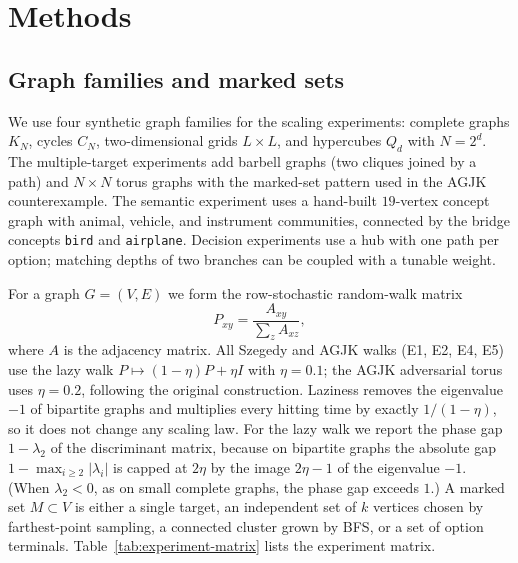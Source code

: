 \section{Methods}
\label{sec:methods}

\subsection{Graph families and marked sets}
\label{sec:methods-graphs}

We use four synthetic graph families for the scaling experiments: complete
graphs $K_N$, cycles $C_N$, two-dimensional grids $L\times L$, and hypercubes
$Q_d$ with $N=2^d$. The multiple-target experiments add barbell graphs
(two cliques joined by a path) and $N\times N$ torus graphs with the marked-set
pattern used in the AGJK counterexample. The semantic experiment uses a
hand-built $19$-vertex concept graph with animal, vehicle, and instrument
communities, connected by the bridge concepts \texttt{bird} and
\texttt{airplane}. Decision experiments use a hub with one path per option;
matching depths of two branches can be coupled with a tunable weight.

For a graph $G=(V,E)$ we form the row-stochastic random-walk matrix
\begin{equation}
  P_{xy}=\frac{A_{xy}}{\sum_{z}A_{xz}},
\end{equation}
where $A$ is the adjacency matrix. All Szegedy and AGJK walks (E1, E2, E4,
E5) use the lazy walk $P\mapsto(1-\eta)P+\eta I$ with $\eta=0.1$; the AGJK
adversarial torus uses $\eta=0.2$, following the original construction.
Laziness removes the eigenvalue $-1$ of bipartite graphs and multiplies every
hitting time by exactly $1/(1-\eta)$, so it does not change any scaling law.
For the lazy walk we report the phase gap $1-\lambda_2$ of the discriminant
matrix, because on bipartite graphs the absolute gap
$1-\max_{i\ge2}\lvert\lambda_i\rvert$ is capped at $2\eta$ by the image
$2\eta-1$ of the eigenvalue $-1$. (When $\lambda_2<0$, as on small complete
graphs, the phase gap exceeds $1$.) A
marked set $M\subset V$ is either a single target, an independent set of $k$
vertices chosen by farthest-point sampling, a connected cluster grown by BFS,
or a set of option terminals. Table~\ref{tab:experiment-matrix} lists the
experiment matrix.

